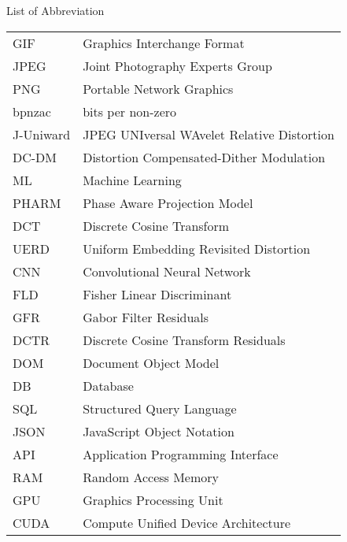 List of Abbreviation
\begin{tabular}{l l}
    GIF         &Graphics Interchange Format\\
    JPEG        &Joint Photography Experts Group\\
    PNG         &Portable Network Graphics\\
    bpnzac      &bits per non-zero\\
    J-Uniward   &JPEG UNIversal WAvelet Relative Distortion\\
    DC-DM       &Distortion Compensated-Dither Modulation\\
    ML          &Machine Learning\\
    PHARM       &Phase Aware Projection Model\\
    DCT         &Discrete Cosine Transform\\
    UERD        &Uniform Embedding Revisited Distortion\\ 
    CNN         &Convolutional Neural Network\\
    FLD         &Fisher Linear Discriminant\\
    GFR         &Gabor Filter Residuals\\
    DCTR        &Discrete Cosine Transform Residuals\\
    DOM         &Document Object Model\\
    DB          &Database\\
    SQL         &Structured Query Language\\
    JSON        &JavaScript Object Notation\\
    API         &Application Programming Interface\\
    RAM         &Random Access Memory\\
    GPU         &Graphics Processing Unit\\
    CUDA        &Compute Unified Device Architecture\\
\end{tabular}

